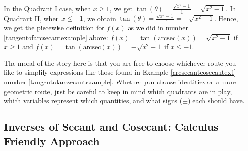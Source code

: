 \documentclass{ximera}
\begin{document}
\begin{image}
\end{image}

 

In the Quadrant I case, when $x \geq 1$, we get $\tan(\theta)  = \frac{\sqrt{x^2-1}}{1} = \sqrt{x^2-1}$.  In Quadrant II, when $x \leq -1$, we obtain  $\tan(\theta)  = \frac{\sqrt{x^2-1}}{-1} = - \sqrt{x^2-1}$.   Hence, we get the piecewise definition for $f(x)$ as we did in number \ref{tangentofarcsecantexample} above:  $f(x)  = \tan(\text{arcsec}(x)) = \sqrt{x^2-1}$ if $x \geq 1$ and $f(x)  = \tan(\text{arcsec}(x)) = -\sqrt{x^2-1}$ if $x \leq -1$.

 

The moral of the story here is that you are free to choose whichever route you like to simplify expressions like those found in Example \ref{arcsecantcosecantex1} number \ref{tangentofarcsecantexample}.  Whether you choose identities or a more geometric route, just be careful to keep in mind which quadrants are in play, which variables represent which quantities, and what signs ($\pm$) each should have.


\subsection{Inverses of Secant and Cosecant: Calculus Friendly Approach}
\label{arcsecantcalcfriendly}
\end{document}
